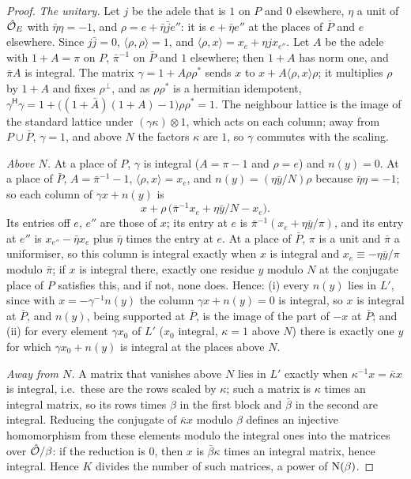 \begin{proof}
\emph{The unitary.} Let $j$ be the adele that is $1$ on $P$ and $0$ elsewhere, $\eta$ a unit of $\hat{\mathcal{O}}_E$ with $\bar\eta\eta=-1$, and $\rho=e+\bar\eta\bar je''$: it is $e+\bar\eta e''$ at the places of $\bar P$ and $e$ elsewhere. Since $j\bar j=0$, $\langle\rho,\rho\rangle=1$, and $\langle\rho,x\rangle=x_e+\eta jx_{e''}$. Let $A$ be the adele with $1+A=\pi$ on
$P$, $\bar\pi^{-1}$ on $\bar P$ and $1$ elsewhere; then $1+A$ has norm one, and $\bar\pi A$ is integral. The matrix $\gamma=1+A\rho\rho^*$ sends $x$ to $x+A\langle\rho,x\rangle\rho$; it multiplies $\rho$ by $1+A$ and fixes $\rho^\perp$, and as $\rho\rho^*$ is a hermitian idempotent, $\gamma^{\mathsf H}\gamma=1+\bigl((1+\bar A)(1+A)-1\bigr)\rho\rho^*=1$.
The neighbour lattice is the image of the standard lattice under $(\gamma\kappa)\otimes1$, which acts on each column; away from $P\cup\bar P$, $\gamma=1$, and above $N$ the factors $\kappa$ are $1$, so $\gamma$ commutes with the scaling.

\emph{Above $N$.} At a place of $P$, $\gamma$ is integral ($A=\pi-1$ and $\rho=e$) and $n(y)=0$. At a place of $\bar P$, $A=\bar\pi^{-1}-1$, $\langle\rho,x\rangle=x_e$, and $n(y)=(\eta\bar y/N)\rho$ because $\bar\eta\eta=-1$; so each column of $\gamma x+n(y)$ is
\[
  x+\rho\,\bigl(\bar\pi^{-1}x_e+\eta\bar y/N-x_e\bigr).
\]
Its entries off $e$, $e''$ are those of $x$; its entry at $e$ is $\bar\pi^{-1}(x_e+\eta\bar y/\pi)$, and its entry at $e''$ is $x_{e''}-\bar\eta x_e$ plus $\bar\eta$ times the entry at $e$. At a place of $\bar P$, $\pi$ is a unit and $\bar\pi$ a uniformiser, so this column is integral exactly when $x$ is integral and $x_e\equiv-\eta\bar y/\pi$ modulo $\bar\pi$; if
$x$ is integral there, exactly one residue $y$ modulo $N$ at the conjugate place of $P$ satisfies this, and if not, none does. Hence: (i) every $n(y)$ lies in $L'$, since with $x=-\gamma^{-1}n(y)$ the column $\gamma x+n(y)=0$ is integral, so $x$ is integral at $\bar P$, and $n(y)$, being supported at $\bar P$, is the image of the part of $-x$ at
$\bar P$; and (ii) for every element $\gamma x_0$ of $L'$ ($x_0$ integral, $\kappa=1$ above $N$) there is exactly one $y$ for which $\gamma x_0+n(y)$ is integral at the places above $N$.

\emph{Away from $N$.} A matrix that vanishes above $N$ lies in $L'$ exactly when $\kappa^{-1}x=\bar\kappa x$ is integral, i.e.\ these are the rows scaled by $\kappa$; such a matrix is $\kappa$ times an integral matrix, so its rows times $\beta$ in the first block and $\bar\beta$ in the second are integral. Reducing the conjugate of $\bar\kappa x$ modulo $\beta$
defines an injective homomorphism from these elements modulo the integral ones into the matrices over $\hat{\mathcal{O}}/\beta$: if the reduction is $0$, then $x$ is $\bar\beta\kappa$ times an integral matrix, hence integral. Hence $K$ divides the number of such matrices, a power of $\operatorname{N}(\beta)$.


\end{proof}
